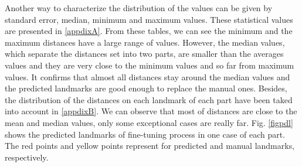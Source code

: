 \documentclass[review]{elsarticle}
\begin{document}
Another way to characterize the distribution of the values can be given by standard error, median, minimum and maximum values. These statistical values are presented in \ref{appdixA}. From these tables, we can see the minimum and the maximum distances have a large range of values. However, the median values, which separate the distances set into two parts, are smaller than the averages values and they are very close to the minimum values and so far from maximum values. It confirms that almost all distances stay around the median values and the predicted landmarks are good enough to replace the manual ones. Besides, the distribution of the distances on each landmark of each part have been taked into account in \ref{appdixB}. We can observe that most of distances are close to the mean and median values, only some exceptional cases are really far. Fig. \ref{figpdl} shows the predicted landmarks of fine-tuning process in one case of each part. The red points and yellow points represent for predicted and manual landmarks, respectively.
\end{document}
